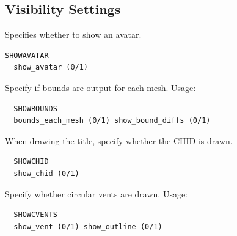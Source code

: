 \documentclass[11pt,twoside]{book}
\newcommand{\parma}{.75}
\newcommand{\parmb}{.5}
\newcommand{\parmc}{0.25}
\newcommand{\blist}{
\begin{list}
{}{
\setlength{\leftmargin}{\parma in}
\setlength{\labelwidth}{\parmb in}
\setlength{\labelsep}{\parmc in}
\setlength{\listparindent}{0.3in}
\setlength{\topsep}{.3in}
\setlength{\parsep}{.0in}
}}
\newcommand{\elist}{\end{list}}
\begin{document}
\subsection{Visibility Settings}
\blist
Specifies whether to show an avatar.
\begin{lstlisting}
SHOWAVATAR
  show_avatar (0/1)
\end{lstlisting}

Specify if bounds are output for each mesh. Usage:
\begin{lstlisting}
  SHOWBOUNDS
  bounds_each_mesh (0/1) show_bound_diffs (0/1)
\end{lstlisting}


When drawing the title, specify whether the CHID is drawn.
\begin{lstlisting}
  SHOWCHID
  show_chid (0/1)
\end{lstlisting}

Specify whether circular vents are drawn. Usage:
\begin{lstlisting}
  SHOWCVENTS
  show_vent (0/1) show_outline (0/1)
\end{lstlisting}


\elist


\end{document}
